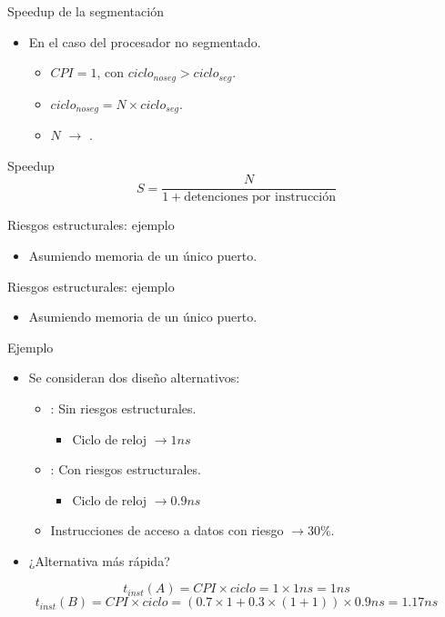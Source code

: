 \begin{frame}[t]{Speedup de la segmentación}
\begin{itemize}
  \item En el caso del procesador no segmentado.
    \begin{itemize}
      \item $CPI=1$, con $ciclo_{noseg} > ciclo_{seg}$.
      \item $ciclo_{noseg} = N \times ciclo_{seg}$.
      \item $N$ $\rightarrow$ .
    \end{itemize}
\end{itemize}
\begin{block}{Speedup}
\[
S =
\frac{N}{1 + \text{detenciones por instrucción}}
\]
\end{block}
\end{frame}

\begin{frame}[t]{Riesgos estructurales: ejemplo}
\makebox[\textwidth][c]{

}
\begin{itemize}
  \item Asumiendo memoria de un único puerto.
\end{itemize}
\end{frame}

\begin{frame}[t]{Riesgos estructurales: ejemplo}
\makebox[\textwidth][c]{

}
\begin{itemize}
  \item Asumiendo memoria de un único puerto.
\end{itemize}
\end{frame}

\begin{frame}[t]{Ejemplo}
\begin{itemize}
  \item Se consideran dos diseño alternativos:
    \begin{itemize}
      \item {}: Sin riesgos estructurales.
        \begin{itemize}
          \item Ciclo de reloj $\rightarrow 1 ns$
        \end{itemize}
      \item {}: Con riesgos estructurales.
        \begin{itemize}
          \item Ciclo de reloj $\rightarrow 0.9 ns$
        \end{itemize}
      \item Instrucciones de acceso a datos con riesgo $\rightarrow 30\%$.
    \end{itemize}
  
  \item ¿Alternativa más rápida?
\end{itemize}
\[
t_{inst}(A) =
CPI \times ciclo = 1 \times 1 ns = 1 ns
\]
\[
t_{inst}(B) =
CPI \times ciclo = (0.7 \times 1 + 0.3 \times (1 + 1)) \times 0.9 ns =
1.17 ns
\]
\end{frame}
